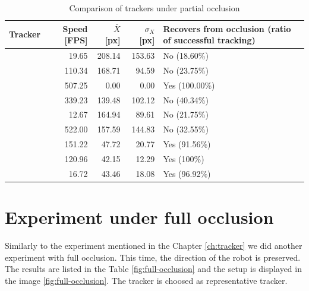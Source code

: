 \begin{table}
\centering
\begin{tabular}{l|r|r|r|p{4cm}}
Tracker & Speed [FPS] & $\bar{X}$ [px] & $\sigma_X$ [px] &  Recovers from occlusion (ratio of successful tracking) \\
\hline
\boost{} & 19.65 & 208.14 & 153.63 & No (18.60\%) \\
\corr{} & 110.34 & 168.71 & 94.59 & No (23.75\%)\\
\hsv{} & 507.25 & 0.00 & 0.00 & Yes (100.00\%) \\
\medflow{} & 339.23 & 139.48 & 102.12 & No (40.34\%) \\
\mil{} & 12.67 & 164.94 & 89.61 &  No (21.75\%)\\
\mosse{} & 522.00 & 157.59 & 144.83 & No (32.55\%) \\
\patt{} & 151.22 & 47.72 & 20.77 & Yes (91.56\%)\\
\simback{} & 120.96 & 42.15 & 12.29 & Yes (100\%)\\
\tld{} & 16.72 & 43.46 & 18.08 & Yes (96.92\%)\\
\end{tabular}
\caption{Comparison of trackers under partial occlusion}
\label{table:partial-occlusion}
\end{table}


\section{Experiment under full occlusion}

Similarly to the experiment mentioned in the Chapter \ref{ch:tracker} we did
another experiment with full occlusion. This time, the direction of the robot
is preserved. The results are listed in the Table \ref{fig:full-occlusion} and
the setup is displayed in the image \ref{fig:full-occlusion}. The \hsv{}
tracker is choosed as representative tracker.


